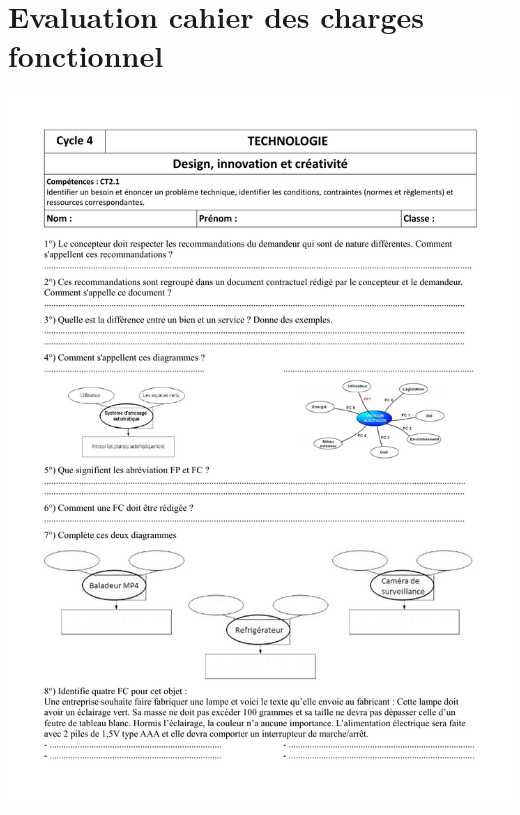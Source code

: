 \section{Evaluation cahier des charges fonctionnel}\label{annexe:evaluation_cdcf}
%

\includegraphics[scale=0.6]{./ressources/Controle_CDCF.pdf} 

